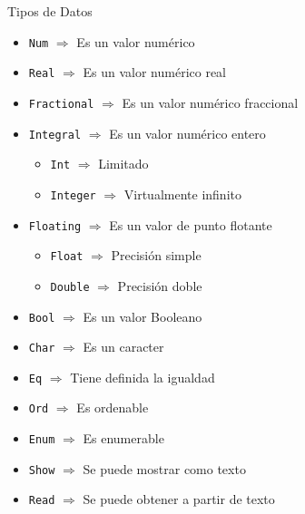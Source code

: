 \begin{frame}[fragile]{Tipos de Datos}
    \begin{itemize}
        \item \verb|Num| $\Rightarrow$ Es un valor numérico
        \item \verb|Real| $\Rightarrow$ Es un valor numérico real
        \item \verb|Fractional| $\Rightarrow$ Es un valor numérico fraccional
        \item \verb|Integral| $\Rightarrow$ Es un valor numérico entero
        \begin{itemize}
            \item \verb|Int| $\Rightarrow$ Limitado
            \item \verb|Integer| $\Rightarrow$ Virtualmente infinito
        \end{itemize}
        \item \verb|Floating| $\Rightarrow$ Es un valor de punto flotante
        \begin{itemize}
            \item \verb|Float| $\Rightarrow$ Precisión simple
            \item \verb|Double| $\Rightarrow$ Precisión doble
        \end{itemize}
        \item \verb|Bool| $\Rightarrow$ Es un valor Booleano
        \item \verb|Char| $\Rightarrow$ Es un caracter
        \item \verb|Eq| $\Rightarrow$ Tiene definida la igualdad
        \item \verb|Ord| $\Rightarrow$ Es ordenable
        \item \verb|Enum| $\Rightarrow$ Es enumerable
        \item \verb|Show| $\Rightarrow$ Se puede mostrar como texto
        \item \verb|Read| $\Rightarrow$ Se puede obtener a partir de texto
    \end{itemize}
\end{frame}

